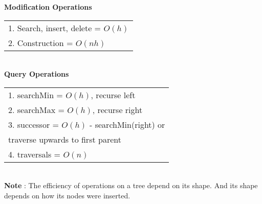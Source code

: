 \documentclass[10pt,landscape]{article}
\begin{document}
\begin{multicols}{3}
\textbf{Modification Operations} \\
\begin{tabular}{l}
1. Search, insert, delete = $O(h)$ \\ 
2. Construction = $O(nh)$
\end{tabular} \\
\textbf{Query Operations}
\begin{tabular}{l}
1. searchMin = $O(h)$, recurse left \\
2. searchMax = $O(h)$, recurse right \\
3. successor = $O(h)$ - searchMin(right) or \\ traverse upwards to first parent \\ 
4. traversals = $O(n)$
\end{tabular} \\
\textbf{Note} : The efficiency of operations on a tree depend on its shape. And its shape depends on how its nodes were inserted. 


\end{multicols}
\end{document}
